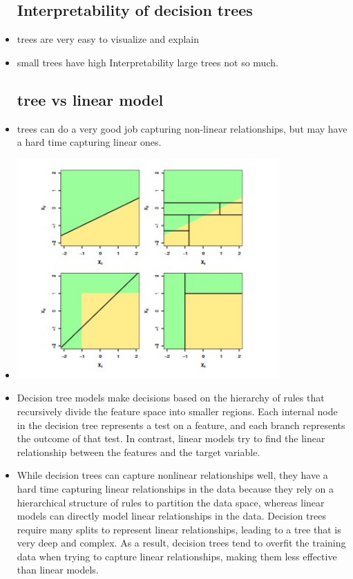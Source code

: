 \documentclass{article}
\begin{document}
\begin{itemize}
\subsection* {Interpretability  of decision trees}
\item trees are very easy to visualize and explain 
\item small trees have high  Interpretability large trees not so much. 
\subsection*{tree vs linear model}
\item trees can do a very good job capturing non-linear relationships, but may have a hard time capturing linear ones. 
\item \includegraphics[width=10cm]{lecture_notes/lecture_9/immages/l9_5.jpg}
\item Decision tree models make decisions based on the hierarchy of rules that recursively divide the feature space into smaller regions. Each internal node in the decision tree represents a test on a feature, and each branch represents the outcome of that test. In contrast, linear models try to find the linear relationship between the features and the target variable.

\item While decision trees can capture nonlinear relationships well, they have a hard time capturing linear relationships in the data because they rely on a hierarchical structure of rules to partition the data space, whereas linear models can directly model linear relationships in the data. Decision trees require many splits to represent linear relationships, leading to a tree that is very deep and complex. As a result, decision trees tend to overfit the training data when trying to capture linear relationships, making them less effective than linear models.


\end{itemize}
\end{document}
